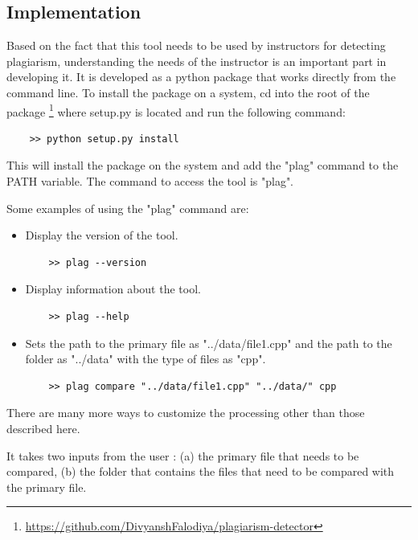 \documentclass[12pt]{article}
\begin{document}
\subsection{Implementation}
Based on the fact that this tool needs to be used by instructors for detecting plagiarism, understanding the needs of the instructor is an important part in developing it. It is developed as a python package that works directly from the command line. To install the package on a system, cd into the root of the package \footnote{\url{https://github.com/DivyanshFalodiya/plagiarism-detector}} where setup.py is located and run the following command:
\begin{verbatim}
    >> python setup.py install
\end{verbatim}
This will install the package on the system and add the "plag" command to the PATH variable.
The command to access the tool is "plag".\par
Some examples of using the "plag" command are:
\begin{itemize}
    \item Display the version of the tool.
    \begin{verbatim}
    >> plag --version
    \end{verbatim}
    
    \item Display information about the tool.
    \begin{verbatim}
    >> plag --help
    \end{verbatim}
    
    \item Sets the path to the primary file as "../data/file1.cpp" and the path to the folder as "../data" with the type of files as "cpp".
    \begin{verbatim}
    >> plag compare "../data/file1.cpp" "../data/" cpp
    \end{verbatim}
\end{itemize}
There are many more ways to customize the processing other than those described here. \par
It takes two inputs from the user : (a) the primary file that needs to be compared, (b) the folder that contains the files that need to be compared with the primary file. \par
\end{document}
